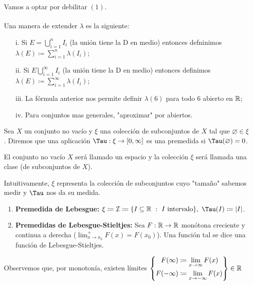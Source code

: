 \documentclass[a4paper]{report}
\begin{document}
	\noindent Vamos a optar por debilitar $(1)$. \\\\
	\noindent Una manera de extender $\lambda$ es la siguiente:
	\begin{enumerate}
		\item[i.] Si $E = \displaystyle\bigcup_{i=1}^{n} I_i$ (la unión tiene la D en medio) entonces defninimos $\lambda(E) \coloneq \sum_{i=1}^{n} \lambda (I_i)$;

		\item[ii.] Si $E \displaystyle\bigcup_{i=1}^{\infty} I_i$ (la unión tiene la D en medio) entonces definimos $\lambda(E) \coloneq \sum_{i=1}^{\infty} \lambda (I_i)$;

		\item[iii.] La fórmula anterior nos permite definir $\lambda (6)$ para todo $6$ abierto en $\mathbb{R}$;

		\item[iv.] Para conjuntos mas generales, "aproximar" por abiertos. 
	\end{enumerate}

	\begin{definition}[premedida]
		Sea $X$ un conjunto no vacío y $\xi$ una colección de subconjuntos de $X$ tal que $\varnothing \in \xi$. Diremos que una aplicación $\Tau : \xi \to [0,\infty]$ es una premedida si $\Tau (\varnothing)=0$.
	\end{definition}

	\begin{remark}
		El conjunto no vacío $X$ será llamado un espacio y la colección $\xi$ será llamada una clase (de subconjuntos de $X$).
	\end{remark}

	\noindent Intuitivamente, $\xi$ representa la colección de subconjuntos cuyo "tamaño" sabemos medir y $\Tau$ nos da su medida.

	\begin{eg}
		\begin{enumerate}
			\item \textbf{Premedida de Lebesgue: } $\xi \coloneq \mathcal{I} \coloneq \{ I \subseteq \R \ : \ I \text{ intervalo}\}, \ \Tau(I) \coloneq |I|$.

			\item \textbf{Premedidas de Lebesgue-Stieltjes: } Sea $F:\mathbb{R} \to \mathbb{R}$ monótona creciente y continua a derecha ($\lim_{x \to x_0}^{+} F(x) = F(x_0)$). Una función tal se dice una función de Lebesgue-Stieltjes. 
		\end{enumerate}
	\end{eg}

	\noindent Observemos que, por monotonía, existen límites $\left\{ \begin{aligned}
		F(\infty) & \coloneq \lim_{x \to \infty} F(x) \\ 
		F(-\infty) & \coloneq \lim_{x \to -\infty} F(x) 
	\end{aligned} \right\} \in \mathbb{R}$








\end{document}
